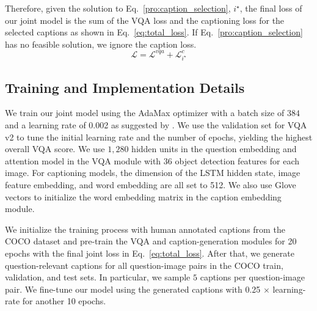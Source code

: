 \documentclass[11pt,a4paper]{article}
\begin{document}
Therefore, given the solution to Eq.\ \ref{pro:caption_selection}, $i^{\star}$, the final loss of our joint model is the sum of the VQA loss and the captioning loss for the selected captions as shown in Eq.\ \ref{eq:total_loss}. If Eq.\ \ref{pro:caption_selection} has no feasible solution, we ignore the caption loss. \\
\begin{equation}
    \mathcal{L} = \mathcal{L}^{vqa} + \mathcal{L}^c_{i^{\star}}
    \label{eq:total_loss}
\end{equation}


\subsection{Training and Implementation Details}
\label{sec:training}
We train our joint model using the AdaMax optimizer \cite{kingma2014adam} with a batch size of $384$ and a learning rate of 0.002 as suggested by . We use the validation set for VQA v2 to tune the initial learning rate and the number of epochs, yielding the highest overall VQA score. We use $1,280$ hidden units in the question embedding and attention model in the VQA module with $36$ object detection features for each image. For captioning models, the dimension of the LSTM hidden state, image feature embedding, and word embedding are all set to 512. We also use Glove vectors \cite{pennington2014glove} to initialize the word embedding matrix in the caption embedding module.

 We initialize the training process with human annotated captions from the COCO dataset \cite{chen2015microsoft} and pre-train the VQA and  caption-generation modules for 20 epochs with the final joint loss in Eq.\ \ref{eq:total_loss}.  After that, we generate question-relevant captions for all question-image pairs in the COCO train, validation, and test sets. In particular, we sample $5$ captions per question-image pair. We fine-tune our model using the generated captions with 0.25 $\times$ learning-rate for another 10 epochs.
\end{document}
